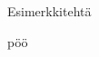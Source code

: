 \begin{tehtavasivu}

\begin{tehtava}
Esimerkkitehtä
	\begin{vastaus}
	pöö
	\end{vastaus}
\end{tehtava}

  
\end{tehtavasivu} 